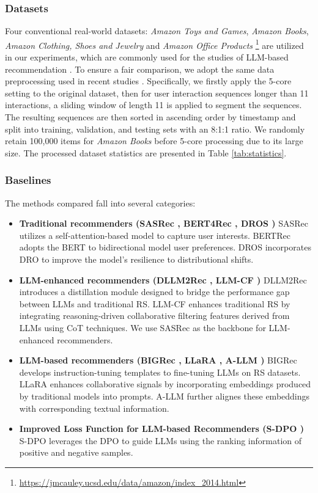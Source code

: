 \documentclass[sigconf,natbib=true]{acmart}
\begin{document}
\subsubsection{Datasets}
Four conventional real-world datasets: \textit{Amazon Toys and Games}, \textit{Amazon Books}, \textit{Amazon Clothing, Shoes and Jewelry} and \textit{Amazon Office Products} \footnote{\url{https://jmcauley.ucsd.edu/data/amazon/index_2014.html}} are utilized in our experiments, which are commonly used for the studies of LLM-based recommendation \cite{cui2024distillation, bao2023bi, cao2024aligning, lee2024star, li2023e4srec}. To ensure a fair comparison, we adopt the same data preprocessing used in recent studies \cite{bao2023bi, cui2024distillation}. Specifically, we firstly apply the 5-core setting to the original dataset, then for user interaction sequences longer than 11 interactions, a sliding window of length 11 is applied to segment the sequences. The resulting sequences are then sorted in ascending order by timestamp and split into training, validation, and testing sets with an 8:1:1 ratio. We randomly retain 100,000 items for \textit{Amazon Books} before 5-core processing due to its large size. The processed dataset statistics are presented in Table \ref{tab:statistics}.

\subsubsection{Baselines}
The methods compared fall into several categories:
\begin{itemize}[left=5pt]
\item \textbf{Traditional recommenders (SASRec \cite{kang2018self}, BERT4Rec \cite{sun2019bert4rec}, DROS \cite{yang2023generic})} SASRec utilizes a self-attention-based model to capture user interests. BERTRec adopts the BERT to bidirectional model user preferences. DROS incorporates DRO to improve the model's resilience to distributional shifts.
\item \textbf{LLM-enhanced recommenders (DLLM2Rec \cite{cui2024distillation}, LLM-CF \cite{sun2024large})} DLLM2Rec introduces a distillation module designed to bridge the performance gap between LLMs and traditional RS. LLM-CF enhances traditional RS by integrating reasoning-driven collaborative filtering features derived from LLMs using CoT techniques. We use SASRec as the backbone for LLM-enhanced recommenders.
\item \textbf{LLM-based recommenders (BIGRec \cite{bao2023bi}, LLaRA \cite{liao2024llara}, A-LLM \cite{kim2024large})} BIGRec develops instruction-tuning templates to fine-tuning LLMs on RS datasets. LLaRA enhances collaborative signals by incorporating embeddings produced by traditional models into prompts. A-LLM further alignes these embeddings with corresponding textual information.
\item \textbf{Improved Loss Function for LLM-based Recommenders (S-DPO \cite{chen2024softmax})} S-DPO leverages the DPO to guide LLMs using the ranking information of positive and negative samples.
\end{itemize}
\end{document}
